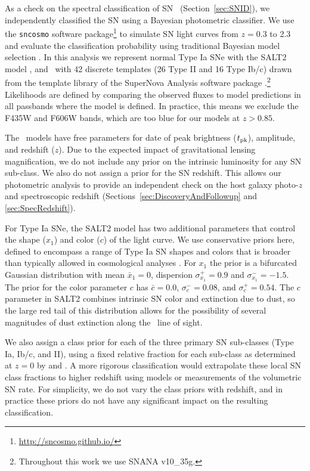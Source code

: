 As a check on the spectral classification of SN \tomas\
(Section~\ref{sec:SNID}), we independently classified the SN using a
Bayesian photometric classifier.  We use the
{\tt sncosmo} software
package\footnote{\url{http://sncosmo.github.io/}} to simulate SN light
curves from $z=0.3$ to 2.3 and evaluate the classification
probability using traditional Bayesian model selection \citep[as
in][]{Jones:2013,Rodney:2014,Graur:2014,Rodney:2015}.  In this
analysis we represent normal Type Ia SNe with the SALT2
model \citep{Guy:2010}, and \CCSNe\ with 42 discrete templates (26
Type II and 16 Type Ib/c) drawn from the template library of the
SuperNova Analysis software
package \citep[SNANA,][]{Kessler:2009a}.\footnote{Throughout this work
we use SNANA v10\_35g.}
Likelihoods are defined by comparing the observed fluxes to model
predictions in all passbands where the model is defined.  In practice,
this means we exclude the F435W and F606W bands, which are too blue
for our models at $z>0.85$.

The \CCSN\ models have free parameters for date of peak brightness
($t_{\rm pk}$), amplitude, and redshift ($z$). Due to the expected
impact of gravitational lensing magnification, we do not include any
prior on the intrinsic luminosity for any SN sub-class.  We also do
not assign a prior for the SN redshift. This allows our photometric
analysis to provide an independent check on the host galaxy photo-$z$
and spectroscopic redshift (Sections~\ref{sec:DiscoveryAndFollowup}
and \ref{sec:SpecRedshift}).

For Type Ia SNe, the SALT2 model has two additional parameters that
control the shape ($x_1$) and color ($c$) of the light curve.  We use
conservative priors here, defined to encompass a range of Type Ia SN
shapes and colors that is broader than typically allowed in
cosmological analyses \citep[see
e.g.][]{Kessler:2009b,Sullivan:2011,Rest:2014}. For $x_1$ the prior is
a bifurcated Gaussian distribution with mean $\bar{x}_1=0$, dispersion
$\sigma_{x_1}^+={0.9}$ and $\sigma_{x_1}^-={-1.5}$.  The prior for the
color parameter $c$ has $\bar{c}=0.0$, $\sigma_c^-=0.08$, and
$\sigma_c^+=0.54$.  The $c$ parameter in SALT2 combines intrinsic SN
color and extinction due to dust, so the large red tail of this
distribution allows for the possibility of several magnitudes
of dust extinction along the \tomas\ line of sight.

We also assign a class prior for each of the three primary SN
sub-classes (Type Ia, Ib/c, and II), using a fixed relative fraction for
each sub-class as determined at $z=0$ by \citet{Smartt:2009}
and \citet{Li:2011a}.  A more rigorous classification would extrapolate
these local SN class fractions to higher redshift using models or
measurements of the volumetric SN rate.  For simplicity, we do not
vary the class priors with redshift, and in practice these priors do
not have any significant impact on the resulting classification.

